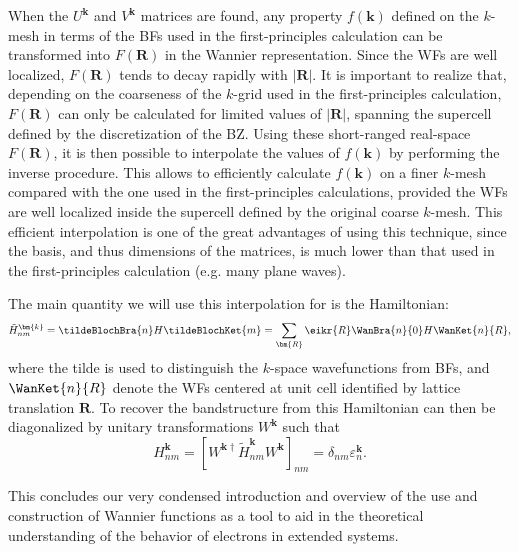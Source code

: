 When the $U^{\bm{k}}$ and $V^{\bm{k}}$ matrices are found, any property $f(\bm{k})$ defined on the $k$-mesh in terms of the BFs used in the first-principles calculation can be transformed into $F(\bm{R})$ in the Wannier representation.
Since the WFs are well localized, $F(\bm{R})$ tends to decay rapidly with $|\bm{R}|$.
It is important to realize that, depending on the coarseness of the $k$-grid used in the first-principles calculation, $F(\bm{R})$ can only be calculated for limited values of $|\bm{R}|$, spanning the supercell defined by the discretization of the BZ.
Using these short-ranged real-space $F(\bm{R})$, it is then possible to interpolate the values of $f(\bm{k})$ by performing the inverse procedure. This allows to efficiently calculate $f(\bm{k})$ on a finer $k$-mesh compared with the one used in the first-principles calculations, provided the WFs are well localized inside the supercell defined by the original coarse $k$-mesh.
This efficient interpolation is one of the great advantages of using this technique, since the basis, and thus dimensions of the matrices, is much lower than that used in the first-principles calculation (e.g. many plane waves).

The main quantity we will use this interpolation for is the Hamiltonian:
\begin{equation}
	\tilde{H}_{nm}^{\bm{k}} = \tildeBlochBra{n} H \tildeBlochKet{m} = \sum_{\bm{R}} \eikr{R} \WanBra{n}{0}H\WanKet{n}{R},
\end{equation}
where the tilde is used to distinguish the $k$-space wavefunctions from BFs, and $\WanKet{n}{R}$ denote the WFs centered at unit cell identified by lattice translation $\bm{R}$.
To recover the bandstructure from this Hamiltonian can then be diagonalized by unitary transformations $W^{\bm{k}}$ such that
\begin{equation}
H_{nm}^{\bm{k}} = [W^{\bm{k}\dagger} \tilde{H}_{nm}^{\bm{k}} W^{\bm{k}}]_{nm} = \delta_{nm} \varepsilon_{n}^{\bm{k}}.
\end{equation}

This concludes our very condensed introduction and overview of the use and construction of Wannier functions as a tool to aid in the theoretical understanding of the behavior of electrons in extended systems.

